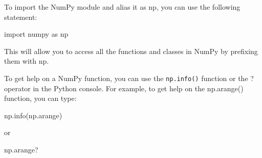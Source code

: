 \documentclass[11pt]{article}
\newenvironment{Shaded}{}{}
\newcommand{\NormalTok}[1]{{#1}}
\newcommand{\ImportTok}[1]{{#1}}
\begin{document}
  To import the NumPy module and alias it as np, you can use the
  following statement:


\begin{Shaded}
\begin{tcolorbox}[breakable, size=fbox, boxrule=1pt, pad at break*=1mm,colback=cellbackground, colframe=cellborder]
  \begin{Highlighting}[]
\ImportTok{import}\NormalTok{ numpy }\ImportTok{as}\NormalTok{ np}
\end{Highlighting}
\end{tcolorbox}
\end{Shaded}

This will allow you to access all the functions and classes in NumPy by
prefixing them with np.

To get help on a NumPy function, you can use the \texttt{np.info()}
function or the ? operator in the Python console. For example, to get
help on the np.arange() function, you can type:

\begin{Shaded}
\begin{tcolorbox}[breakable, size=fbox, boxrule=1pt, pad at break*=1mm,colback=cellbackground, colframe=cellborder]
  \begin{Highlighting}[]
\NormalTok{np.info(np.arange)}
\end{Highlighting}
\end{tcolorbox}
\end{Shaded}

or

\begin{Shaded}
\begin{tcolorbox}[breakable, size=fbox, boxrule=1pt, pad at break*=1mm,colback=cellbackground, colframe=cellborder]
  \begin{Highlighting}[]
\NormalTok{np.arange?}
\end{Highlighting}
\end{tcolorbox}
\end{Shaded}
\end{document}
